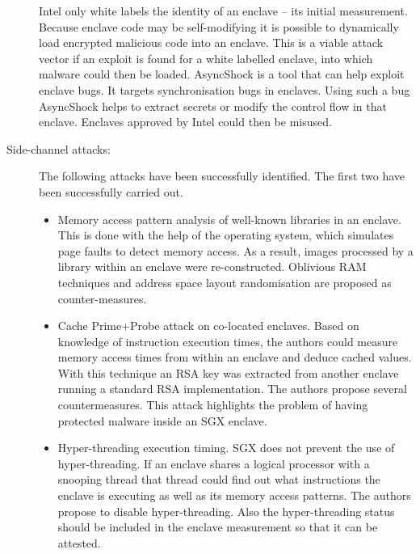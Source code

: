 \begin{description}
Intel only white labels the identity of an enclave -- its initial measurement. Because enclave code may be self-modifying it is possible to dynamically load encrypted malicious code into an enclave. This is a viable attack vector if an exploit is found for a white labelled enclave, into which malware could then be loaded.\cite[]{schwarz2017malware}\label{ID_1914733350}
AsyncShock is a tool that can help exploit enclave bugs. It targets synchronisation bugs in enclaves. Using such a bug AsyncShock helps to extract secrets or modify the control flow in that enclave. Enclaves approved by Intel could then be misused.\cite[]{Weichbrodt2016}\label{ID_1238669801}
\item[Side-channel attacks:]\label{ID_140344652}
The following attacks have been successfully identified. The first two have been successfully carried out.\label{ID_1298323933}
\begin{itemize}\label{ID_1098508864}
\item Memory access pattern analysis of well-known libraries in an enclave. This is done with the help of the operating system, which simulates page faults to detect memory access. As a result, images processed by a library within an enclave were re-constructed. Oblivious RAM techniques and address space layout randomisation are proposed as counter-measures.\cite[]{Xu2015}\label{ID_784348582}
\item Cache Prime+Probe attack on co-located enclaves. Based on knowledge of instruction execution times, the authors could measure memory access times from within an enclave and deduce cached values. With this technique an RSA key was extracted from another enclave running a standard RSA implementation. The authors propose several countermeasures. This attack highlights the problem of having protected malware inside an SGX enclave.\cite[]{schwarz2017malware}\label{ID_1818357587}
\item Hyper-threading execution timing. SGX does not prevent the use of hyper-threading. If an enclave shares a logical processor with a snooping thread that thread could find out what instructions the enclave is executing as well as its memory access patterns. The authors propose to disable hyper-threading. Also the hyper-threading status should be included in the enclave measurement so that it can be attested.\cite[]{sgx-explained}\label{ID_1173647836}
\end{itemize}\label{ID_960745123}
\begin{figure}[H]
	\begin{center}

\end{center}
\end{figure}
\end{description}
